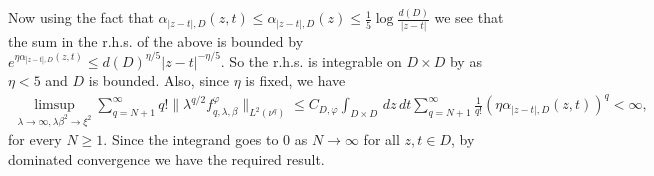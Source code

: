 \documentclass[a4paper, 11pt, reqno]{amsart}
\theoremstyle{definition} \newtheorem{defn}{Definition}[section]
\theoremstyle{remark} \newtheorem{rem}[defn]{Remark}
\theoremstyle{remark} \newtheorem*{rem*}{Remark}
\theoremstyle{plain} \newtheorem{thm}[defn]{Theorem}
\theoremstyle{plain} \newtheorem{lem}[defn]{Lemma}
\theoremstyle{plain} \newtheorem{prop}[defn]{Proposition}
\theoremstyle{plain} \newtheorem{cor}[defn]{Corollary}
\theoremstyle{remark} \newtheorem{exm}[defn]{\textbf{Example}}
\theoremstyle{remark} \newtheorem{exms}[defn]{\textbf{Examples}}
\theoremstyle{remark} \newtheorem*{bl}{}
\numberwithin{equation}{section} %
\newcommand{\x}{\times}
\begin{document}
		  Now using the fact that $\alpha_{|z-t|, D} (z,t) \le \alpha_{|z-t|, D}(z) \le \frac{1}{5} \log \frac{d(D)}{|z-t|} $ we see that the sum in the r.h.s. of the above is bounded by $ e^{\eta \alpha_{|z-t|, D} (z,t)} \le  d(D)^{\eta/5} |z-t|^{-\eta/5}$. So the r.h.s. is integrable on $D\x D$ by \cite[Lemma A1]{cgpr21} as $\eta<5$ and $D$ is bounded. Also, since $\eta$ is fixed, we have 
		\begin{align}
			\limsup_{\lambda \to \infty, \lambda\beta^2 \to \xi^2}\sum_{q= N+1}^{\infty} q! \lVert \lambda^{q/2} f^{\varphi}_{q,\lambda, \beta}\rVert_{L^2(\nu^q)} 
            \le C_{D, \varphi} \int_{D\x D} \, dz \, dt \sum_{q= N+1}^{\infty} \frac{1}{q!}  (\eta \alpha_{|z-t|, D} (z,t))^q < \infty,
		\end{align}
		for every $N \ge 1$. Since the integrand goes to $0$ as $N \to \infty$ for all $z, t \in D$, by dominated convergence we have the required result. 
	

 

\end{document}
